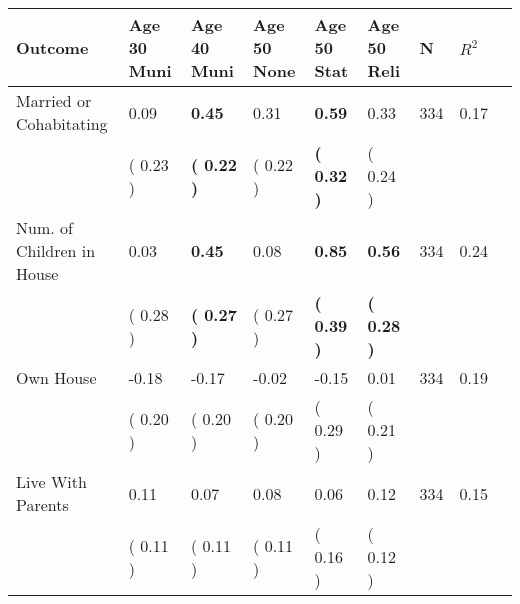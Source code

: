 \begin{tabular}{L{6.2cm} C{1.8cm} C{1.8cm} C{1.8cm} C{1.8cm} C{1.8cm} C{1.8cm} C{0.3cm} C{0.3cm}}
\toprule
 \textbf{Outcome} & \textbf{Age 30 Muni} & \textbf{Age 40 Muni} & \textbf{Age 50 None} & \textbf{Age 50 Stat} & \textbf{Age 50 Reli} & \textbf{N} & \textbf{$ R^2$} \\
\midrule
Married or Cohabitating &      0.09 & \textbf{     0.45} &      0.31 & \textbf{     0.59} &      0.33  & 334 &       0.17 \\ 
 & (     0.23 ) & \textbf{(     0.22 )} & (     0.22 ) & \textbf{(     0.32 )} & (     0.24 )  & \\
Num. of Children in House &      0.03 & \textbf{     0.45} &      0.08 & \textbf{     0.85} & \textbf{     0.56}  & 334 &       0.24 \\ 
 & (     0.28 ) & \textbf{(     0.27 )} & (     0.27 ) & \textbf{(     0.39 )} & \textbf{(     0.28 )}  & \\
Own House &     -0.18 &     -0.17 &     -0.02 &     -0.15 &      0.01  & 334 &       0.19 \\ 
 & (     0.20 ) & (     0.20 ) & (     0.20 ) & (     0.29 ) & (     0.21 )  & \\
Live With Parents &      0.11 &      0.07 &      0.08 &      0.06 &      0.12  & 334 &       0.15 \\ 
 & (     0.11 ) & (     0.11 ) & (     0.11 ) & (     0.16 ) & (     0.12 )  & \\
\bottomrule
\end{tabular}
